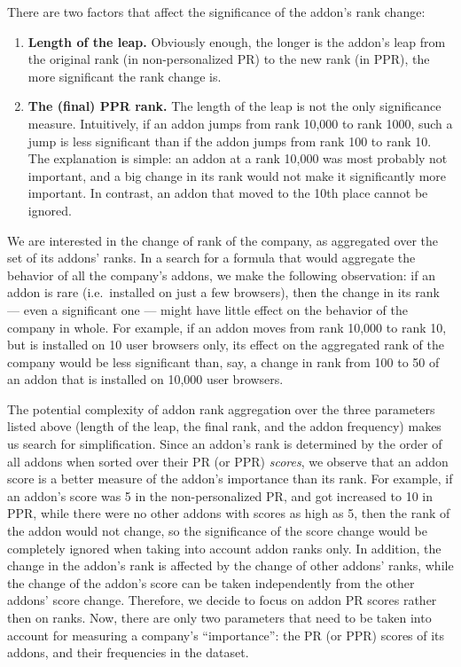 \documentclass[11pt,oneside]{book}
\begin{document}
There are two factors that affect the significance of the addon's rank change:
\begin{enumerate}
\item \textbf{Length of the leap.} Obviously enough, the longer is the addon's leap from the original rank (in non-personalized PR) to the new rank (in PPR), the more significant the rank change is.
\item \textbf{The (final) PPR rank.} The length of the leap is not the only significance measure. Intuitively, if an addon jumps from rank 10,000 to rank 1000, such a jump is less significant than if the addon jumps from rank 100 to rank 10. The explanation is simple: an addon at a rank 10,000 was most probably not important, and a big change in its rank would not make it significantly more important. In contrast, an addon that moved to the 10th place cannot be ignored.
\end{enumerate}

We are interested in the change of rank of the company, as aggregated over the set of its addons' ranks. In a search for a formula that would aggregate the behavior of all the company's addons, we make the following observation: if an addon is rare (i.e.~installed on just a few browsers), then the change in its rank --- even a significant one --- might have little effect on the behavior of the company in whole. For example, if an addon moves from rank 10,000 to rank 10, but is installed on 10 user browsers only, its effect on the aggregated rank of the company would be less significant than, say, a change in rank from 100 to 50 of an addon that is installed on 10,000 user browsers.

The potential complexity of addon rank aggregation over the three parameters listed above (length of the leap, the final rank, and the addon frequency) makes us search for simplification. Since an addon's rank is determined by the order of all addons when sorted over their PR (or PPR) \emph{scores}, we observe that an addon score is a better measure of the addon's importance than its rank. For example, if an addon's score was 5 in the non-personalized PR, and got increased to 10 in PPR, while there were no other addons with scores as high as 5, then the rank of the addon would not change, so the significance of the score change would be completely ignored when taking into account addon ranks only. In addition, the change in the addon's rank is affected by the change of other addons' ranks, while the change of the addon's score can be taken independently from the other addons' score change. Therefore, we decide to focus on addon PR scores rather then on ranks. Now, there are only two parameters that need to be taken into account for measuring a company's ``importance'': the PR (or PPR) scores of its addons, and their frequencies in the dataset.
\end{document}
